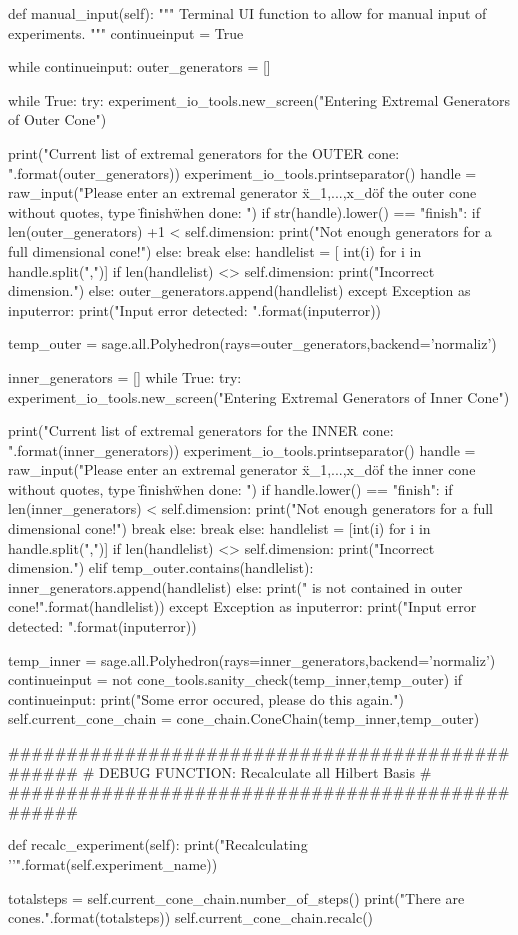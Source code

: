\documentclass{TC}
\begin{document}
\begin{SAGE}
 	def manual_input(self):
 		""" Terminal UI function to allow for manual input of experiments. """
		continueinput = True

		while continueinput:
			outer_generators = []
		
			while True:
				try:
					experiment_io_tools.new_screen("Entering Extremal Generators of Outer Cone")
					
					print("Current list of extremal generators for the OUTER cone: {}".format(outer_generators))
					experiment_io_tools.printseparator()
					handle = raw_input("Please enter an extremal generator \"x_1,...,x_d\" of the outer cone without quotes, \nor type \"finish\" when done: ")
					if str(handle).lower() == "finish":
						if len(outer_generators) +1 < self.dimension:
							print("Not enough generators for a full dimensional cone!")
						else:
							break
					else:
						handlelist = [ int(i) for i in handle.split(",")]						
						if len(handlelist) <> self.dimension:
							print("Incorrect dimension.")
						else:
							outer_generators.append(handlelist)		
				except Exception as inputerror:
					print("Input error detected: {}".format(inputerror))
				
			temp_outer = sage.all.Polyhedron(rays=outer_generators,backend='normaliz')
			
			inner_generators = []
			while True:
				try:
					experiment_io_tools.new_screen("Entering Extremal Generators of Inner Cone")

					print("Current list of extremal generators for the INNER cone: {}".format(inner_generators))
					experiment_io_tools.printseparator()
					handle = raw_input("Please enter an extremal generator \"x_1,...,x_d\" of the inner cone without quotes, \nor type \"finish\" when done: ")
					if handle.lower() == "finish":
						if len(inner_generators) < self.dimension:
							print("Not enough generators for a full dimensional cone!")
							break
						else:
							break
					else:
						handlelist = [int(i) for i in handle.split(",")]						
						if len(handlelist) <> self.dimension:
							print("Incorrect dimension.")
						elif temp_outer.contains(handlelist):
							inner_generators.append(handlelist)
						else:
							print("{} is not contained in outer cone!".format(handlelist))				
				except Exception as inputerror:
					print("Input error detected: {}".format(inputerror))
				
			temp_inner = sage.all.Polyhedron(rays=inner_generators,backend='normaliz')
			continueinput = not cone_tools.sanity_check(temp_inner,temp_outer)
			if continueinput:
				print("Some error occured, please do this again.")
		self.current_cone_chain = cone_chain.ConeChain(temp_inner,temp_outer)

	#################################################
	# DEBUG FUNCTION: Recalculate all Hilbert Basis #
	#################################################

	def recalc_experiment(self):
		print("Recalculating '{}'".format(self.experiment_name))

		totalsteps = self.current_cone_chain.number_of_steps()
		print("There are {} cones.".format(totalsteps))
		self.current_cone_chain.recalc()

\end{SAGE}
\end{document}
